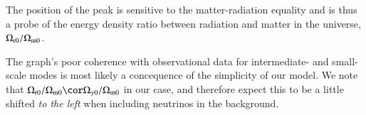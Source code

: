 The position of the peak is sensitive to the matter-radiation equality and is thus a probe of the energy density ratio between radiation and matter in the universe, $\Omega_{\mathrm{r}0}/\Omega_{\mathrm{m}0}$. 






The graph's poor coherence with observational data for intermediate- and small-scale modes is most likely a concequence of the simplicity of our model. We note that $\OmgR/\OmgM\cor \Omega_{\gamma 0}/\OmgM$ in our case, and therefore expect this to be a little shifted \emph{to the left} when including neutrinos in the background.  


